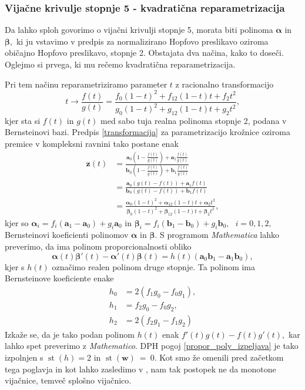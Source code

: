 \documentclass[12pt,a4paper,twoside]{article}
\theoremstyle{definition} %
\theoremstyle{plain} %
\theoremstyle{primerstyle}
\numberwithin{equation}{section}  %
\newcommand{\aV}{\mathbf{a}}
\newcommand{\bV}{\mathbf{b}}
\newcommand{\wV}{\mathbf{w}}
\newcommand{\zV}{\mathbf{z}}
\newcommand{\balpha}{\boldsymbol \alpha}
\newcommand{\bbeta}{\boldsymbol \beta}
\DeclareMathOperator{\st}{st}
\begin{document}
\subsubsection{Vijačne krivulje stopnje 5 - kvadratična reparametrizacija}
\label{kvadraticna_reparametrizacija_5}

Da lahko sploh govorimo o vijačni krivulji stopnje 5, morata biti polinoma $\balpha$ in $\bbeta,$ ki ju vstavimo v predpis za normalizirano Hopfovo preslikavo oziroma običajno Hopfovo preslikavo, stopnje 2. Obstajata dva načina, kako to doseči. Oglejmo si prvega, ki mu rečemo kvadratična reparametrizacija.

Pri tem načinu reparametriziramo parameter $t$ z racionalno transformacijo
\begin{equation}
	\label{kvadraticna_reparametrizacija}
	t\to\frac{f(t)}{g(t)}=\frac{f_0(1-t)^2+f_12(1-t)t+f_2t^2}{g_0(1-t)^2+g_12(1-t)t+g_2t^2},
\end{equation}
kjer sta si $f(t)$ in $g(t)$ med sabo tuja realna polinoma stopnje 2, podana v Bernsteinovi bazi. Predpis \eqref{transformacija} za parametrizacijo krožnice oziroma premice v kompleksni ravnini tako postane enak
\begin{align*}
	\zV(t)&=\frac{\aV_0\left(1-\frac{f(t)}{g(t)}\right)+\aV_1\frac{f(t)}{g(t)}}{\bV_0\left(1-\frac{f(t)}{g(t)}\right)+\bV_1\frac{f(t)}{g(t)}}\\
	&=\frac{\aV_0(g(t)-f(t))+\aV_1f(t)}{\bV_0(g(t)-f(t))+\bV_1f(t)}\\
	&=\frac{\balpha_0(1-t)^2+\balpha_12(1-t)t+\balpha_2t^2}{\bbeta_0(1-t)^2+\bbeta_12(1-t)t+\bbeta_2t^2},
\end{align*}
kjer so $\balpha_i=f_i(\aV_1-\aV_0)+g_i\aV_0$ in $\bbeta_i=f_i(\bV_1-\bV_0)+g_i\bV_0,\text{ }i=0,1,2,$ Bernsteinovi koeficienti polinomov $\balpha$ in $\bbeta.$ S programom \emph{Mathematica} lahko preverimo, da ima polinom proporcionalnosti obliko
\begin{equation*}
	\balpha(t)\bbeta'(t)-\balpha'(t)\bbeta(t)=h(t)(\aV_0\bV_1-\aV_1\bV_0),
\end{equation*}
kjer s $h(t)$ označimo realen polinom druge stopnje. Ta polinom ima Bernsteinove koeficiente enake
\begin{align}
	h_0&=2(f_1g_0-f_0g_1),\nonumber\\
	h_1&=f_2g_0-f_0g_2,\label{polinom_h_kvadra_repara}\\
	h_2&=2(f_2g_1-f_1g_2)\nonumber
\end{align}
Izkaže se, da je tako podan polinom $h(t)$ enak $f'(t)g(t)-f(t)g'(t),$ kar lahko spet preverimo z \emph{Mathematico}. DPH pogoj \eqref{propor_poly_izpeljava} je tako izpolnjen s $\st(h)=2$ in $\st(\wV)~=~0.$ Kot smo že omenili pred začetkom tega poglavja in kot lahko zasledimo v \cite{beltranmonterde}, nam tak postopek ne da monotone vijačnice, temveč splošno vijačnico.
\end{document}
